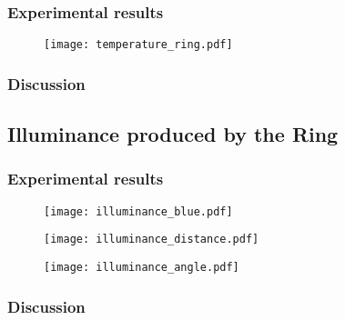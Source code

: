 \subsubsection{Experimental results}

\begin{figure}[ht]
	\centering
	\texttt{[image: temperature\_ring.pdf]}
	\caption{}
	\label{fig:temperature_ring}
\end{figure}

\subsubsection{Discussion}

\subsection{Illuminance produced by the Ring}
\subsubsection{Experimental results}

\begin{figure}[ht]
	\centering
	\texttt{[image: illuminance\_blue.pdf]}
	\caption{}
	\label{fig:illuminance_blue}
\end{figure}

\begin{figure}[ht]
	\centering
	\texttt{[image: illuminance\_distance.pdf]}
	\caption{}
	\label{fig:illuminance_distance}
\end{figure}

\begin{figure}[ht]
	\centering
	\texttt{[image: illuminance\_angle.pdf]}
	\caption{}
	\label{fig:illuminance_angle}
\end{figure}

\subsubsection{Discussion}